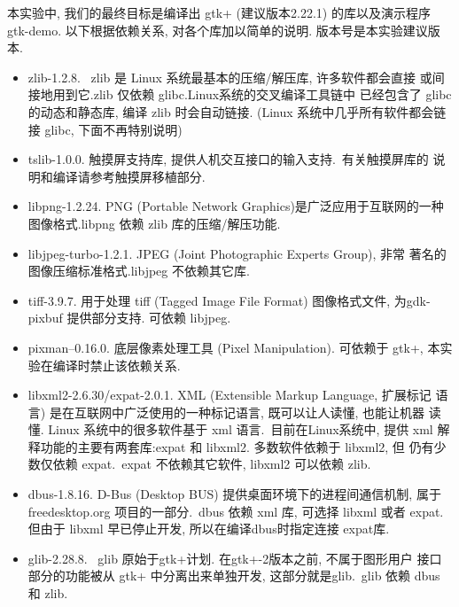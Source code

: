 本实验中, 我们的最终目标是编译出 gtk+ (建议版本2.22.1) 的库以及演示程序
gtk-demo. 以下根据依赖关系, 对各个库加以简单的说明. 版本号是本实验建议版本.
\begin{itemize}
  \item zlib-1.2.8. \ zlib 是 Linux 系统最基本的压缩/解压库, 许多软件都会直接
      或间接地用到它.\@ zlib 仅依赖 glibc. Linux系统的交叉编译工具链中
      已经包含了 glibc 的动态和静态库, 编译 zlib 时会自动链接.
      (Linux 系统中几乎所有软件都会链接 glibc, 下面不再特别说明)

  \item tslib-1.0.0. 触摸屏支持库, 提供人机交互接口的输入支持.~有关触摸屏库的
      说明和编译请参考触摸屏移植部分.

  \item libpng-1.2.24. PNG (Portable Network Graphics)是广泛应用于互联网的一种
      图像格式.\@ libpng 依赖 zlib 库的压缩/解压功能.

  \item libjpeg-turbo-1.2.1. JPEG (Joint Photographic Experts Group), 非常
      著名的图像压缩标准格式.libjpeg 不依赖其它库.

  \item tiff-3.9.7. 用于处理 tiff (Tagged Image File Format) 图像格式文件,
      为gdk-pixbuf 提供部分支持. 可依赖 libjpeg.

  \item pixman--0.16.0. 底层像素处理工具 (Pixel Manipulation). 可依赖于
      gtk+, 本实验在编译时禁止该依赖关系.

  \item libxml2-2.6.30/expat-2.0.1. XML (Extensible Markup Language, 扩展标记
      语言) 是在互联网中广泛使用的一种标记语言, 既可以让人读懂, 也能让机器
      读懂. Linux 系统中的很多软件基于 xml 语言.~目前在Linux系统中, 提供 xml
      解释功能的主要有两套库:expat 和 libxml2. 多数软件依赖于 libxml2, 但
      仍有少数仅依赖 expat.\ expat 不依赖其它软件, libxml2 可以依赖 zlib.

  \item dbus-1.8.16. D-Bus (Desktop BUS) 提供桌面环境下的进程间通信机制, 属于
      freedesktop.org 项目的一部分.\ dbus 依赖 xml 库, 可选择 libxml 或者
      expat. 但由于 libxml 早已停止开发, 所以在编译dbus时指定连接 expat库.

  \item glib-2.28.8. \ glib 原始于gtk+计划. 在gtk+-2版本之前, 不属于图形用户
      接口部分的功能被从 gtk+ 中分离出来单独开发, 这部分就是glib.\ glib 依赖
      dbus 和 zlib.


\end{itemize}
